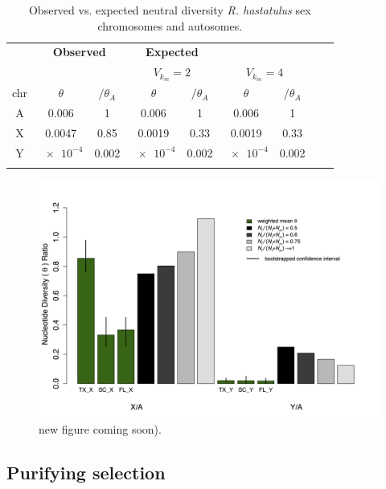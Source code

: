 \documentclass[9pt,twocolumn,twoside]{gsajnl}
\begin{document}
\begin{table}[htb]
\centering
\caption{Observed vs. expected neutral diversity  \textit{R. hastatulus} sex chromosomes and autosomes.}
\begin{tabular}{ccccccccc}
\textbf{} & \multicolumn{2}{c}{\textbf{Observed}} & \multicolumn{2}{c}{\textbf{Expected}} \\
\textbf{} & \multicolumn{2}{c}{\textbf{}} & \multicolumn{2}{c}{\textbf{$V_{k}_{m} = 2$}} & \multicolumn{2}{c}{\textbf{$V_{k}_{m} = 4$}} \\

chr & $\theta$ & $/\theta_{A}$ & $\theta$ & $/\theta_{A}$ & $\theta$ & $/\theta_{A}$ \\
\midrule
A & 0.006 & 1 & 0.006 & 1 & 0.006 & 1 \\
X & 0.0047 & 0.85 & 0.0019 & 0.33 & 0.0019 & 0.33 \\
Y & $\num{e-4}$ & 0.002 & $\num{e-4}$ & 0.002 & $\num{e-4}$ & 0.002 \\
\addlinespace

\bottomrule
\end{tabular}
\end{table}

\begin{figure}[htbp]
\centering
\noindent
\includegraphics[width=\linewidth]{figure2.jpg}
\caption{new figure coming soon).
}
\label{fig:spectrum}
\end{figure}

\subsection*{Purifying selection}
\end{document}
